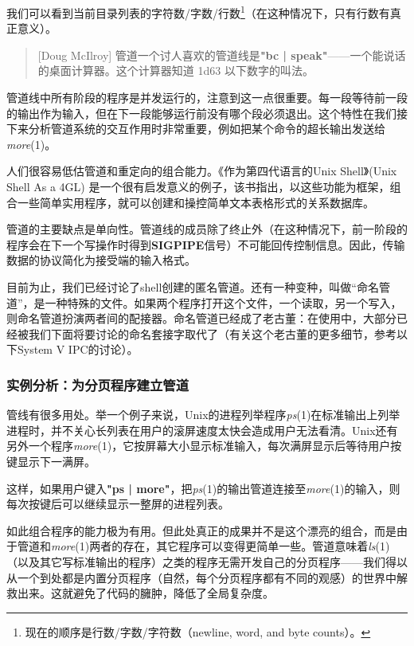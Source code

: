 \documentclass[12pt,oneside]{book}
\begin{document}
我们可以看到当前目录列表的字符数/字数/行数\footnote{现在的顺序是行数/字数/字符数（newline, word, and byte counts）。}（在这种情况下，只有行数有真正意义）。

\begin{quote}[Doug McIlroy]
管道一个讨人喜欢的管道线是\textbf{"bc | speak"}——一个能说话的桌面计算器。这个计算器知道 1d63 以下数字的叫法。
\end{quote}

管道线中所有阶段的程序是并发运行的，注意到这一点很重要。每一段等待前一段的输出作为输入，但在下一段能够运行前没有哪个段必须退出。这个特性在我们接下来分析管道系统的交互作用时非常重要，例如把某个命令的超长输出发送给\textit{more}(1)。

人们很容易低估管道和重定向的组合能力。《作为第四代语言的Unix Shell》(Unix Shell As a 4GL) \cite{Schaffer-Wolf}是一个很有启发意义的例子，该书指出，以这些功能为框架，组合一些简单实用程序，就可以创建和操控简单文本表格形式的关系数据库。

管道的主要缺点是单向性。管道线的成员除了终止外（在这种情况下，前一阶段的程序会在下一个写操作时得到\textbf{SIGPIPE}信号）不可能回传控制信息。因此，传输数据的协议简化为接受端的输入格式。

目前为止，我们已经讨论了shell创建的匿名管道。还有一种变种，叫做“命名管道”，是一种特殊的文件。如果两个程序打开这个文件，一个读取，另一个写入，则命名管道扮演两者间的配接器。命名管道已经成了老古董：在使用中，大部分已经被我们下面将要讨论的命名套接字取代了（有关这个老古董的更多细节，参考以下System V IPC的讨论）。


\subsubsection{实例分析：为分页程序建立管道}
管线有很多用处。举一个例子来说，Unix的进程列举程序\textit{ps}(1)在标准输出上列举进程时，并不关心长列表在用户的滚屏速度太快会造成用户无法看清。Unix还有另外一个程序\textit{more}(1)，它按屏幕大小显示标准输入，每次满屏显示后等待用户按键显示下一满屏。

这样，如果用户键入\textbf{"ps | more"}，把\textit{ps}(1)的输出管道连接至\textit{more}(1)的输入，则每次按键后可以继续显示一整屏的进程列表。

如此组合程序的能力极为有用。但此处真正的成果并不是这个漂亮的组合，而是由于管道和\textit{more}(1)两者的存在，其它程序可以变得更简单一些。管道意味着\textit{ls}(1)（以及其它写标准输出的程序）之类的程序无需开发自己的分页程序——我们得以从一个到处都是内置分页程序（自然，每个分页程序都有不同的观感）的世界中解救出来。这就避免了代码的臃肿，降低了全局复杂度。
\end{document}
